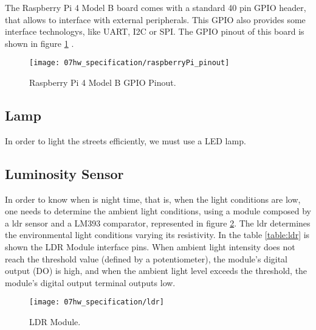 The Raspberry Pi 4 Model B board comes with a standard 40 pin GPIO header, that allows to interface with external peripherals. This GPIO also provides some interface technologys, like UART, I2C or SPI. The GPIO pinout of this board is shown in figure \ref{fig:rasp_pinout} \cite{pinout}.

\begin{figure}[ht]
	\centering
	\texttt{[image: 07hw\_specification/raspberryPi\_pinout]}
	\caption{Raspberry Pi 4 Model B GPIO Pinout.}
	\label{fig:rasp_pinout}
\end{figure}

\subsection{Lamp}

In order to light the streets efficiently, we must use a LED lamp. 

\subsection{Luminosity Sensor}

In order to know when is night time, that is, when the light conditions are low, one needs to determine the ambient light conditions, using a module composed by a \ac{ldr} sensor and a LM393 comparator, represented in figure \ref{fig:ldr}. The \ac{ldr} determines the environmental light conditions varying its resistivity. In the table \ref{table:ldr} is shown the LDR Module interface pins. When ambient light intensity does not reach the threshold value (defined by a potentiometer), the module's digital output (DO) is high, and when the ambient light level exceeds the threshold, the module's digital output terminal outputs low.

\begin{figure}[ht]
	\centering
	\texttt{[image: 07hw\_specification/ldr]}
	\caption{LDR Module.}
	\label{fig:ldr}
\end{figure}

\begin{table}[H]
	\centering
	
	\caption{LDR Module Interface Pins.}
	\label{table:ldr}
\end{table}

